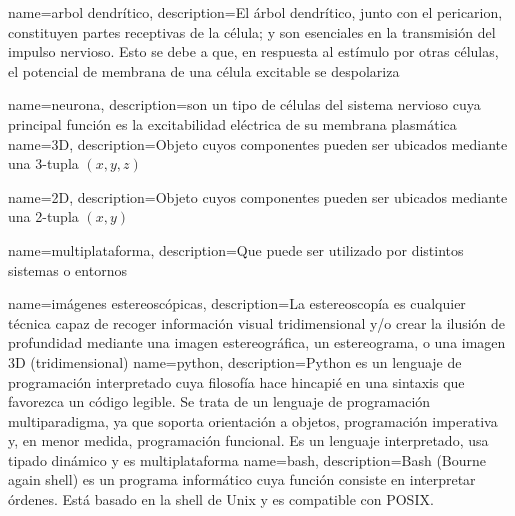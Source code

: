 {
	name=arbol dendrítico,
	description={El árbol dendrítico, junto con el pericarion, constituyen partes receptivas de la célula; y son esenciales en la transmisión del impulso nervioso. Esto se debe a que, en respuesta al estímulo por otras células, el potencial de membrana de una célula excitable se despolariza} 
}


{
	name=neurona,
	description={son un tipo de células del sistema nervioso cuya principal función es la excitabilidad eléctrica de su membrana plasmática} 
}
{
	name=3D,
	description={Objeto cuyos componentes pueden ser ubicados mediante una 3-tupla $(x,y,z)$} 
}


{
	name=2D,
	description={Objeto cuyos componentes pueden ser ubicados mediante una 2-tupla $(x,y)$} 
}

{
	name=multiplataforma,
	description={Que puede ser utilizado por distintos sistemas o entornos} 
}

{
	name=imágenes estereoscópicas,
	description={La estereoscopía es cualquier técnica capaz de recoger información visual tridimensional y/o crear la ilusión de profundidad mediante una imagen estereográfica, un estereograma, o una imagen \gls{3D} (tridimensional)} 
}
{
	name=python,
	description={Python es un lenguaje de programación interpretado cuya filosofía hace hincapié en una sintaxis que favorezca un código legible. Se trata de un lenguaje de programación multiparadigma, ya que soporta orientación a objetos, programación imperativa y, en menor medida, programación funcional. Es un lenguaje interpretado, usa tipado dinámico y es multiplataforma} 
} 
{
	name=bash,
	description={Bash (Bourne again shell) es un programa informático cuya función consiste en interpretar órdenes. Está basado en la shell de Unix y es compatible con POSIX.} 
} 


